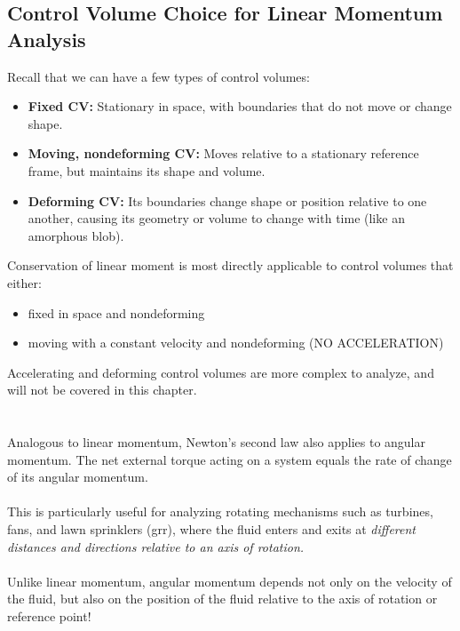 ﻿\documentclass[12pt]{article}
\begin{document}
\subsection*{Control Volume Choice for Linear Momentum Analysis}
Recall that we can have a few types of control volumes:
\begin{itemize}
    \item \textbf{Fixed CV:} Stationary in space, with boundaries that do not move or change shape.
    \item \textbf{Moving, nondeforming CV:} Moves relative to a stationary reference frame, but maintains its shape and volume.
    \item \textbf{Deforming CV:} Its boundaries change shape or position relative to one another, causing its geometry or volume to change with time (like an amorphous blob).
\end{itemize}
Conservation of linear moment is most directly applicable to control volumes that either:
\begin{itemize}
    \item fixed in space and nondeforming
    \item moving with a constant velocity and nondeforming (NO ACCELERATION)
\end{itemize}
Accelerating and deforming control volumes are more complex to analyze, and will not be covered in this chapter.
\section*{}
Analogous to linear momentum, Newton's second law also applies to angular momentum. The net external torque acting on a system equals the rate of change of its angular momentum.\\\\
This is particularly useful for analyzing rotating mechanisms such as turbines, fans, and lawn sprinklers (grr), where the fluid enters and exits at \textit{different distances and directions relative to an axis of rotation.}\\\\
Unlike linear momentum, angular momentum depends not only on the velocity of the fluid, but also on the position of the fluid relative to the axis of rotation or reference point!
\end{document}

